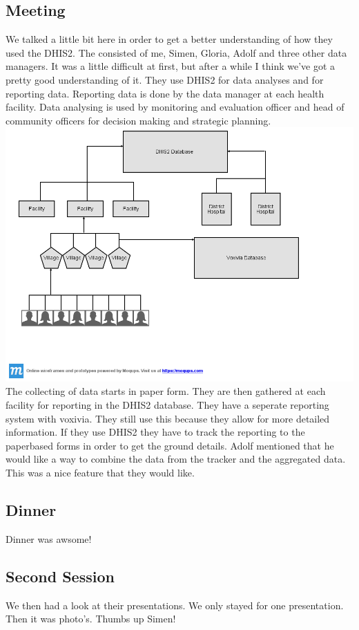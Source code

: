 \subsection{Meeting}
We talked a little bit here in order to get a better understanding of how they used the DHIS2. The consisted of me, Simen, Gloria, Adolf and three other data managers. It was a little difficult at first, but after a while I think we've got a pretty good understanding of it. They use DHIS2 for data analyses and for reporting data. Reporting data is done by the data manager at each health facility. Data analysing is used by monitoring and evaluation officer and head of community officers for decision making and strategic planning. \\
\includegraphics[width=15cm]{appendix/images/Dataflow} \\
The collecting of data starts in paper form. They are then gathered at each facility for reporting in the DHIS2 database. They have a seperate reporting system with voxivia. They still use this because they allow for more detailed information. If they use DHIS2 they have to track the reporting to the paperbased forms in order to get the ground details. Adolf mentioned that he would like a way to combine the data from the tracker and the aggregated data. This was a nice feature that they would like.
\subsection{Dinner}
Dinner was awsome!
\subsection{Second Session}
We then had a look at their presentations. We only stayed for one presentation. Then it was photo's. Thumbs up Simen!
